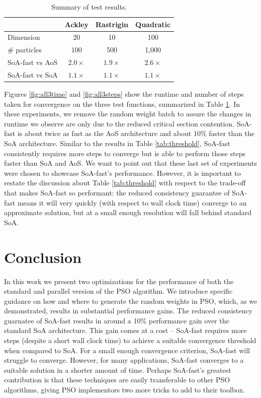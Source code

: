 \begin{table}
  \centering
  \caption{Summary of test results.}
  \label{tab:results}
  \begin{tabular}{lccc}\toprule
    & \textbf{Ackley} & \textbf{Rastrigin} & \textbf{Quadratic}\\\midrule
    Dimension & 20 & 10 & 100\\
    \# particles & 100 & 500 & 1,000\\
    SoA-fast vs AoS & $2.0\times$ & $1.9\times$ & $2.6\times$\\
    SoA-fast vs SoA & $1.1\times$ & $1.1\times$ & $1.1\times$\\\bottomrule
  \end{tabular}
\end{table}

Figures \ref{fig:all3time} and \ref{fig:all3steps} show the runtime and number
of steps taken for convergence on the three test functions, summarized in Table
\ref{tab:results}.
In these experiments, we remove the random weight batch to assure the changes in
runtime we observe are only due to the reduced critical section contention.
SoA-fast is about twice as fast as the AoS architecture and
about 10\% faster than the SoA architecture. Similar to the results in Table
\ref{tab:threshold}, SoA-fast consistently requires more steps to converge but
is able to perform those steps faster than SoA and AoS. We want to point out
that these last set of experiments were chosen to showcase SoA-fast's performance.
However, it is important to restate the discussion about Table \ref{tab:threshold}
with respect to the trade-off that makes SoA-fast so performant: the reduced
consistency guarantee of SoA-fast means it will very quickly (with respect to
wall clock time) converge to an approximate solution, but at a small enough
resolution will fall behind standard SoA.

\section{Conclusion}
In this work we present two optimizations for the performance of both the
standard and parallel version of the PSO algorithm. We introduce
specific guidance on how and where to generate the random weights in
PSO, which, as we demonstrated, results in substantial performance gains. 
The reduced consistency guarnatee of SoA-fast results in around a 10\% performance
gain over the standard SoA architecture. This gain comes at a cost -- SoA-fast
requires more steps (despite a short wall clock time) to achieve a suitable
convergence threshold when compared to SoA. For a small enough convergence
criterion, SoA-fast will struggle to converge. However, for many applications,
SoA-fast converges to a suitable solution in a shorter amount of time. Perhaps
SoA-fast's greatest contribution is that these techniques are easily transferable
to other PSO algorithms, giving PSO implementors two more tricks to add to their
toolbox.


